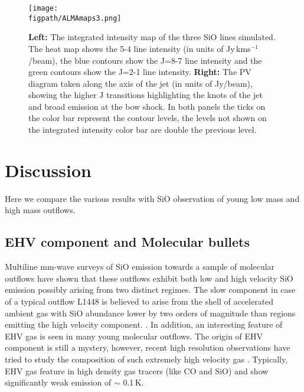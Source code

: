 \documentclass[useAMS,usenatbib,letters]{mn2e}
\newcommand{\figpath}{PFIGS/}
\begin{document}
\begin{figure*}
 \texttt{[image: \\figpath/ALMAmaps3.png]}
 \caption{{\bf Left:} The integrated intensity map of the three SiO lines simulated. The heat map shows the 5-4 line intensity (in units of Jy$\,$kms$^{-1}$/beam), the blue contours show the J=8-7 line intensity and the green contours show the J=2-1 line intensity. {\bf Right:} The PV diagram taken along the axis of the jet (in units of Jy/beam), showing the higher J transitions highlighting the knots of the jet and broad emission at the bow shock. In both panels the ticks on the color bar represent the contour levels, the levels not shown on the integrated intensity color bar are double the previous level.}
\label{fig:almafig}
\end{figure*} 

\section{Discussion}
Here we compare the various results with SiO observation of young low
mass and high mass outflows.

\subsection{EHV component and Molecular bullets}
\label{ssec:EHV}
Multiline mm-wave surveys of SiO emission towards a sample of molecular
outflows have shown that these outflows exhibit both low and high
velocity SiO emission possibly arising from two distinct regimes. The slow
component in case of a typical outflow L1448 is believed to arise from
the shell of accelerated ambient gas with SiO abundance
lower by two orders of magnitude than regions emitting the high velocity component.
\cite{Codella:1999p12584}. In addition, an interesting feature of EHV
gas is seen in many young molecular outflows. The origin of EHV
component is still a mystery, however, recent high resolution
observations have tried to study the composition of such extremely high
velocity gas \cite{Tafalla:2010p14759}. Typically, EHV gas feature in
high density gas tracers (like CO and SiO) 
and show significantly weak emission of $\sim$ 0.1\,K.
%
\end{document}
